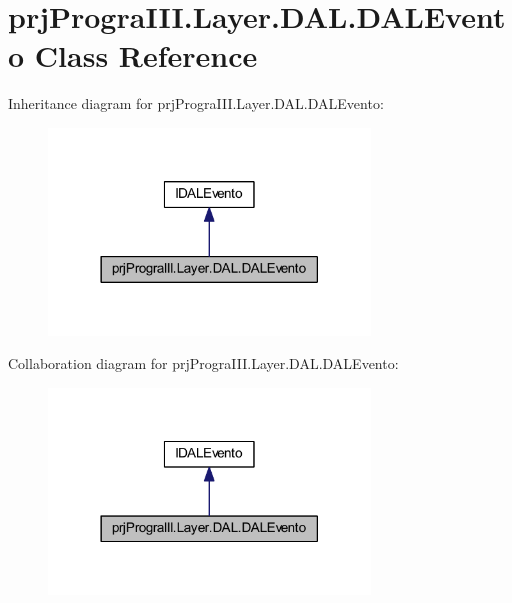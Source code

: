 \hypertarget{classprj_progra_i_i_i_1_1_layer_1_1_d_a_l_1_1_d_a_l_evento}{}\section{prj\+Progra\+I\+I\+I.\+Layer.\+D\+A\+L.\+D\+A\+L\+Evento Class Reference}
\label{classprj_progra_i_i_i_1_1_layer_1_1_d_a_l_1_1_d_a_l_evento}


Inheritance diagram for prj\+Progra\+I\+I\+I.\+Layer.\+D\+A\+L.\+D\+A\+L\+Evento\+:
\nopagebreak
\begin{figure}[H]
\begin{center}
\leavevmode
\includegraphics[width=242pt]{classprj_progra_i_i_i_1_1_layer_1_1_d_a_l_1_1_d_a_l_evento__inherit__graph}
\end{center}
\end{figure}


Collaboration diagram for prj\+Progra\+I\+I\+I.\+Layer.\+D\+A\+L.\+D\+A\+L\+Evento\+:
\nopagebreak
\begin{figure}[H]
\begin{center}
\leavevmode
\includegraphics[width=242pt]{classprj_progra_i_i_i_1_1_layer_1_1_d_a_l_1_1_d_a_l_evento__coll__graph}
\end{center}
\end{figure}
